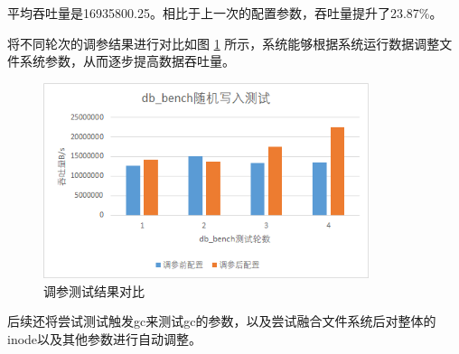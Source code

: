 平均吞吐量是16935800.25。相比于上一次的配置参数，吞吐量提升了23.87\%。

将不同轮次的调参结果进行对比如图 \ref{test-turnner} 所示，系统能够根据系统运行数据调整文件系统参数，从而逐步提高数据吞吐量。

\begin{figure}[htbp]
  \centering
  \includegraphics[width=0.85\textwidth]{fig/test-turnner}
  \caption{ 调参测试结果对比 }
  \label{test-turnner}
\end{figure}

后续还将尝试测试触发gc来测试gc的参数，以及尝试融合文件系统后对整体的inode以及其他参数进行自动调整。

